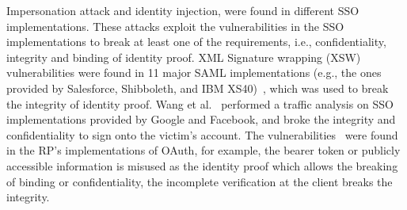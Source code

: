 Impersonation attack and identity injection, were found in different SSO implementations. These attacks exploit the vulnerabilities in the SSO implementations 
to break at least one of the requirements, i.e., confidentiality, integrity and binding of identity proof.
XML Signature wrapping (XSW) vulnerabilities were found in 11 major SAML implementations (e.g., the ones provided by Salesforce, Shibboleth, and IBM XS40)~\cite{SomorovskyMSKJ12}, which was used to break the integrity of identity proof.
Wang et al.~\cite{WangCW12} performed a traffic analysis on SSO implementations provided by Google and Facebook, and broke the integrity and confidentiality to sign onto the victim's account.
The vulnerabilities~\cite{ZhouE14,WangZLG16,YangLLZH16} were found in the RP's implementations of OAuth, for example, the bearer token or publicly accessible information is misused as the identity proof which allows the breaking of binding or confidentiality, the incomplete verification at the client breaks the integrity.



